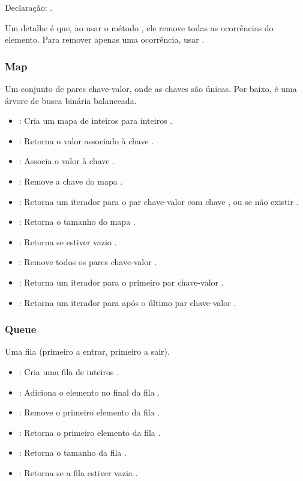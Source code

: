 Declaração: .

Um detalhe é que, ao usar o método , ele remove todas as ocorrências do elemento. Para remover apenas uma ocorrência, usar .

\subsubsection{Map}

Um conjunto de pares chave-valor, onde as chaves são únicas. Por baixo, é uma árvore de busca binária balanceada.
\begin{itemize}\setlength\itemsep{0pt}
    \item {}: Cria um mapa de inteiros para inteiros .
    \item {}: Retorna o valor associado à chave  .
    \item {}: Associa o valor  à chave  .
    \item {}: Remove a chave do mapa .
    \item {}: Retorna um iterador para o par chave-valor com chave , ou  se não existir .
    \item {}: Retorna o tamanho do mapa .
    \item {}: Retorna  se estiver vazio .
    \item {}: Remove todos os pares chave-valor .
    \item {}: Retorna um iterador para o primeiro par chave-valor .
    \item {}: Retorna um iterador para após o último par chave-valor .
\end{itemize}

\subsubsection{Queue}

Uma fila (primeiro a entrar, primeiro a sair).
\begin{itemize}\setlength\itemsep{0pt}
    \item {}: Cria uma fila de inteiros .
    \item {}: Adiciona o elemento  no final da fila .
    \item {}: Remove o primeiro elemento da fila .
    \item {}: Retorna o primeiro elemento da fila .
    \item {}: Retorna o tamanho da fila .
    \item {}: Retorna  se a fila estiver vazia .
\end{itemize}

